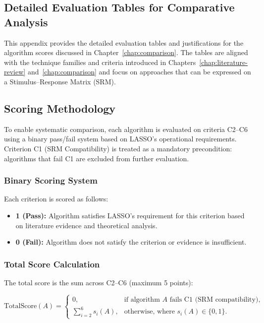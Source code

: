 \begin{appendices}

\section{Detailed Evaluation Tables for Comparative Analysis}\label{app:evaluation-tables}

This appendix provides the detailed evaluation tables and justifications for the algorithm scores discussed in Chapter~\ref{chap:comparison}. The tables are aligned with the technique families and criteria introduced in Chapters~\ref{chap:literature-review} and~\ref{chap:comparison} and focus on approaches that can be expressed on a Stimulus--Response Matrix (SRM).

\subsection{Scoring Methodology}

To enable systematic comparison, each algorithm is evaluated on criteria C2--C6 using a binary pass/fail system based on LASSO's operational requirements. Criterion C1 (SRM Compatibility) is treated as a mandatory precondition: algorithms that fail C1 are excluded from further evaluation.

\subsubsection*{Binary Scoring System}

Each criterion is scored as follows:

\begin{itemize}
  \item \textbf{1 (Pass):} Algorithm satisfies LASSO's requirement for this criterion based on literature evidence and theoretical analysis.
  \item \textbf{0 (Fail):} Algorithm does not satisfy the criterion or evidence is insufficient.
\end{itemize}

\subsubsection*{Total Score Calculation}

The total score is the sum across C2--C6 (maximum 5 points):

\begin{equation}
  \text{TotalScore}(A) =
  \begin{cases}
    0, & \text{if algorithm } A \text{ fails C1 (SRM compatibility)}, \\[3pt]
    \displaystyle\sum_{i=2}^{6} s_i(A), & \text{otherwise, where } s_i(A) \in \{0,1\}.
  \end{cases}
\end{equation}


\end{appendices}
